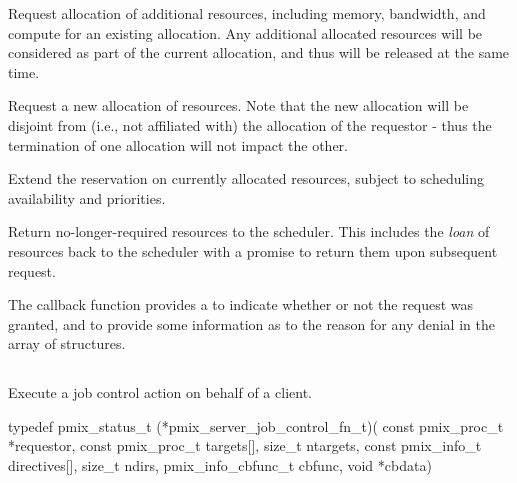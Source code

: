 \begin{compactitem}
%
\item Request allocation of additional resources, including memory, bandwidth, and compute for an existing allocation. Any additional allocated resources will be considered as part of the current allocation, and thus will be released at the same time.
%
\item Request a new allocation of resources. Note that the new allocation will be disjoint from (i.e., not affiliated with) the allocation of the requestor - thus the termination of one allocation will not impact the other.
%
\item Extend the reservation on currently allocated resources, subject to scheduling availability and priorities.
%
\item Return no-longer-required resources to the scheduler.
This includes the \textit{loan} of resources back to the scheduler with a promise to return them upon subsequent request.
\end{compactitem}

The callback function provides a  to indicate whether or not the request was granted, and to provide some information as to the reason for any denial in the  array of  structures.


\subsection{}

\summary

Execute a job control action on behalf of a client.

\format

\cspecificstart
\begin{codepar}
typedef pmix_status_t (*pmix_server_job_control_fn_t)(
                             const pmix_proc_t *requestor,
                             const pmix_proc_t targets[], size_t ntargets,
                             const pmix_info_t directives[], size_t ndirs,
                             pmix_info_cbfunc_t cbfunc, void *cbdata)
\end{codepar}
\cspecificend

\begin{arglist}
\end{arglist}

